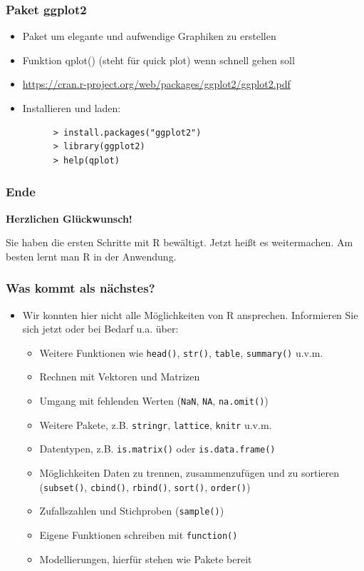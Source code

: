 \documentclass{beamer}
\begin{document}
\begin{frame}[fragile]
  \frametitle{Paket ggplot2}
  \begin{itemize}
    \item Paket um elegante und aufwendige Graphiken zu erstellen
    \item Funktion qplot() (steht für quick plot) wenn schnell gehen soll
    \item \url{https://cran.r-project.org/web/packages/ggplot2/ggplot2.pdf}
    \item Installieren und laden:
    \begin{Verbatim}
      > install.packages("ggplot2")
      > library(ggplot2)    
      > help(qplot)
      \end{Verbatim}
  \end{itemize}
\end{frame}

\begin{frame}[fragile]
  \frametitle{Ende}
  \begin{center}
    \LARGE \bfseries
    Herzlichen Glückwunsch!
  \end{center}
  \vspace{18pt}
  Sie haben die ersten Schritte mit R bewältigt. Jetzt heißt es weitermachen. Am besten lernt man R in der Anwendung.
\end{frame}

\begin{frame}
  \frametitle{Was kommt als nächstes?}
  \begin{itemize}
    \item Wir konnten hier nicht alle Möglichkeiten von R ansprechen. Informieren Sie sich jetzt oder bei Bedarf u.a. über:
        \begin{itemize}
    \item Weitere Funktionen wie \Verb+head()+, \Verb+str()+, \Verb+table+, \Verb+summary()+ u.v.m.
    \item Rechnen mit Vektoren und Matrizen 
    \item Umgang mit fehlenden Werten (\Verb+NaN+, \Verb+NA+, \Verb+na.omit()+)
    \item Weitere Pakete, z.B. \Verb+stringr+, \Verb+lattice+, \Verb+knitr+ u.v.m.
    \item Datentypen, z.B. \Verb+is.matrix()+ oder \Verb+is.data.frame()+
    \item Möglichkeiten Daten zu trennen, zusammenzufügen und zu sortieren (\Verb+subset()+, \Verb+cbind()+, \Verb+rbind()+, \Verb+sort()+, \Verb+order()+)
    \item Zufallszahlen und Stichproben (\Verb+sample()+)
    \item Eigene Funktionen schreiben mit \Verb+function()+
    \item Modellierungen, hierfür stehen wie Pakete bereit
  \end{itemize}
  \end{itemize}
\end{frame}

\end{document}
